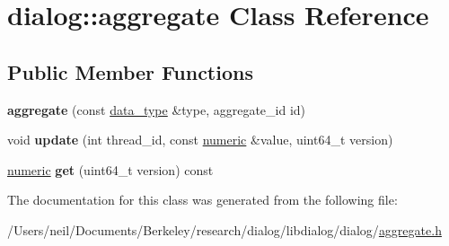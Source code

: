 \hypertarget{classdialog_1_1aggregate}{}\section{dialog\+:\+:aggregate Class Reference}
\label{classdialog_1_1aggregate}
\subsection*{Public Member Functions}
\begin{DoxyCompactItemize}
\item 
\mbox{\label{classdialog_1_1aggregate_adb01273ecbcfab050af6d2f9e7125f83}} 
{\bfseries aggregate} (const \hyperlink{structdialog_1_1data__type}{data\+\_\+type} \&type, aggregate\+\_\+id id)
\item 
\mbox{\label{classdialog_1_1aggregate_a08c8a1c6f17188d98f5c5082cfe1b7ed}} 
void {\bfseries update} (int thread\+\_\+id, const \hyperlink{classdialog_1_1numeric}{numeric} \&value, uint64\+\_\+t version)
\item 
\mbox{\label{classdialog_1_1aggregate_ae0d27427b3b0f7d2e4a38f3961a7224f}} 
\hyperlink{classdialog_1_1numeric}{numeric} {\bfseries get} (uint64\+\_\+t version) const
\end{DoxyCompactItemize}


The documentation for this class was generated from the following file\+:\begin{DoxyCompactItemize}
\item 
/\+Users/neil/\+Documents/\+Berkeley/research/dialog/libdialog/dialog/\hyperlink{aggregate_8h}{aggregate.\+h}\end{DoxyCompactItemize}
